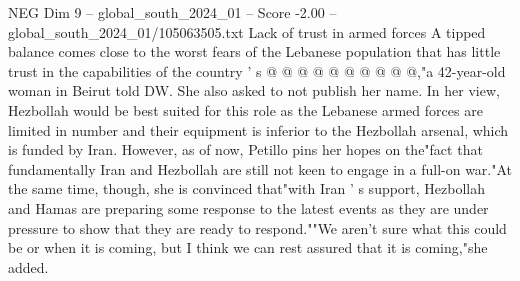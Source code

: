 \begin{textsample}{NEG Dim 9 – global\_south\_2024\_01 – Score -2.00 – global\_south\_2024\_01/105063505.txt}
Lack of trust in armed forces A tipped balance comes close to the worst fears of the Lebanese population that has little trust in the capabilities of the country ' s @ @ @ @ @ @ @ @ @ @,"a 42-year-old woman in Beirut told DW.
She also asked to not publish her name.
In her view, Hezbollah would be best suited for this role as the Lebanese armed forces are limited in number and their equipment is inferior to the Hezbollah arsenal, which is funded by Iran.
However, as of now, Petillo pins her hopes on the"fact that fundamentally Iran and Hezbollah are still not keen to engage in a full-on war."At the same time, though, she is convinced that"with Iran ' s support, Hezbollah and Hamas are preparing some response to the latest events as they are under pressure to show that they are ready to respond.""We aren't sure what this could be or when it is coming, but I think we can rest assured that it is coming,"she added.

\end{textsample}

